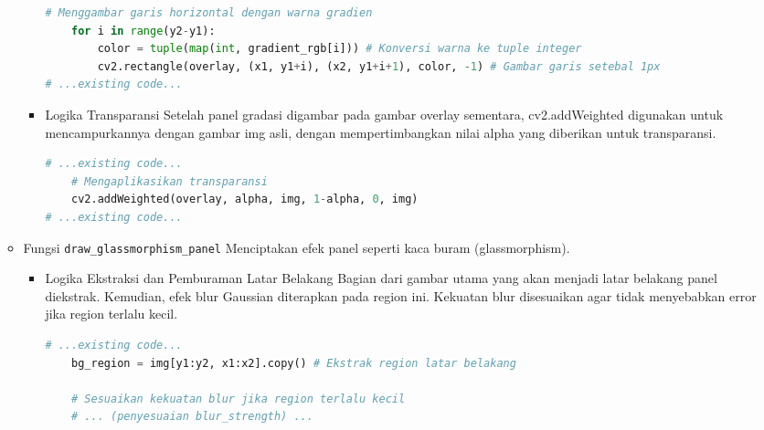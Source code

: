 \documentclass[11pt,a4paper]{article}
\begin{document}
\begin{itemize}
\begin{itemize}
\begin{itemize}
\begin{lstlisting}[language=Python, caption=Logika pembuatan gradasi dan penggambaran]
    # Menggambar garis horizontal dengan warna gradien
    for i in range(y2-y1):
        color = tuple(map(int, gradient_rgb[i])) # Konversi warna ke tuple integer
        cv2.rectangle(overlay, (x1, y1+i), (x2, y1+i+1), color, -1) # Gambar garis setebal 1px
# ...existing code...
\end{lstlisting}
\item Logika Transparansi
\newline Setelah panel gradasi digambar pada gambar overlay sementara, cv2.addWeighted digunakan untuk mencampurkannya dengan gambar img asli, dengan mempertimbangkan nilai alpha yang diberikan untuk transparansi.
\begin{lstlisting}[language=Python, caption=Logika transparansi]
# ...existing code...
    # Mengaplikasikan transparansi
    cv2.addWeighted(overlay, alpha, img, 1-alpha, 0, img)
# ...existing code...
\end{lstlisting}
\end{itemize}

\item Fungsi \texttt{draw\_glassmorphism\_panel}
\newline Menciptakan efek panel seperti kaca buram (glassmorphism).
\begin{itemize}
\item Logika Ekstraksi dan Pemburaman Latar Belakang
\newline Bagian dari gambar utama yang akan menjadi latar belakang panel diekstrak. Kemudian, efek blur Gaussian diterapkan pada region ini. Kekuatan blur disesuaikan agar tidak menyebabkan error jika region terlalu kecil.
\begin{lstlisting}[language=Python, caption=Logika ekstraksi dan pemburaman latar belakang]
# ...existing code...
    bg_region = img[y1:y2, x1:x2].copy() # Ekstrak region latar belakang
    
    # Sesuaikan kekuatan blur jika region terlalu kecil
    # ... (penyesuaian blur_strength) ...


\end{lstlisting}
\end{itemize}
\end{itemize}
\end{itemize}
\end{document}
